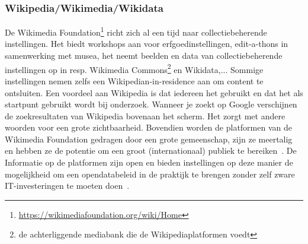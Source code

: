 \documentclass[fleqn,10pt]{voorstel}
\begin{document}
\subsubsection{Wikipedia/Wikimedia/Wikidata}
De Wikimedia Foundation\footnote{\href{https://wikimediafoundation.org/wiki/Home}{https://wikimediafoundation.org/wiki/Home}} richt zich al een tijd naar collectiebeherende instellingen. Het biedt workshops aan voor erfgoedinstellingen, edit-a-thons in samenwerking met musea, het neemt beelden en data van collectiebeherende instellingen op in resp. Wikimedia Commons\footnote{de achterliggende mediabank die de Wikipediaplatformen voedt} en Wikidata,... Sommige instellingen nemen zelfs een Wikipedian-in-residence aan om content te ontsluiten. Een voordeel aan Wikipedia is dat iedereen het gebruikt en dat het als startpunt gebruikt wordt bij onderzoek. Wanneer je zoekt op Google verschijnen de zoekresultaten van Wikipedia bovenaan het scherm. Het zorgt met andere woorden voor een grote zichtbaarheid. Bovendien worden de platformen van de Wikimedia Foundation gedragen door een grote gemeenschap, zijn ze meertalig en hebben ze de potentie om een groot (internationaal) publiek te bereiken~\autocite{Further2016}. De Informatie op de platformen zijn open en bieden instellingen op deze manier de mogelijkheid om een opendatabeleid in de praktijk te brengen zonder zelf zware IT-investeringen te moeten doen~\autocite{Saenko2016}.
\end{document}
